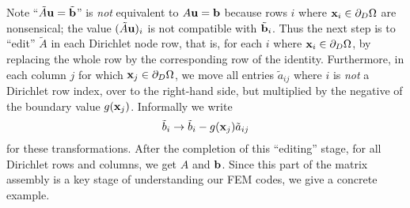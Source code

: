 Note ``$\tilde A \mathbf{u} =\tilde {\mathbf{b}}$'' is \emph{not} equivalent to $A\mathbf{u} = \mathbf{b}$ because rows $i$ where $\mathbf{x}_i \in \partial_D \Omega$ are nonsensical; the value $(\tilde A \mathbf{u})_i$ is not compatible with $\tilde {\mathbf{b}}_i$.  Thus the next step is to  ``edit'' $\tilde A$ in each Dirichlet node row, that is, for each $i$ where $\mathbf{x}_i \in \partial_D \Omega$, by replacing the whole row by the corresponding row of the identity.  Furthermore, in each column $j$ for which $\mathbf{x}_j \in \partial_D \Omega$, we move all entries $\tilde a_{ij}$ where $i$ is \emph{not} a Dirichlet row index, over to the right-hand side, but multiplied by the negative of the boundary value $g(\mathbf{x}_{j})$.  Informally we write
    $$\tilde b_i \to \tilde b_i - g(\mathbf{x}_{j}) \tilde a_{ij}$$
for these transformations.  After the completion of this ``editing'' stage, for all Dirichlet rows and columns, we get $A$ and $\mathbf{b}$.  Since this part of the matrix assembly is a key stage of understanding our FEM codes, we give a concrete example.

